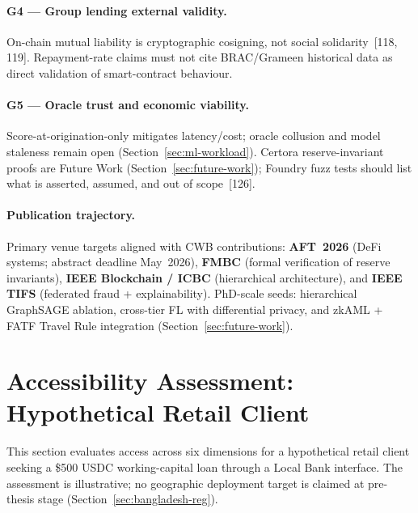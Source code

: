 \documentclass[12pt,a4paper]{report}
\begin{document}
\paragraph{G4 --- Group lending external validity.}
On-chain mutual liability is cryptographic cosigning, not social solidarity~[118, 119]. Repayment-rate claims must not cite BRAC/Grameen historical data as direct validation of smart-contract behaviour.

\paragraph{G5 --- Oracle trust and economic viability.}
Score-at-origination-only mitigates latency/cost; oracle collusion and model staleness remain open (Section~\ref{sec:ml-workload}). Certora reserve-invariant proofs are Future Work (Section~\ref{sec:future-work}); Foundry fuzz tests should list what is asserted, assumed, and out of scope~[126].

\paragraph{Publication trajectory.}
Primary venue targets aligned with CWB contributions: \textbf{AFT~2026} (DeFi systems; abstract deadline May~2026), \textbf{FMBC} (formal verification of reserve invariants), \textbf{IEEE Blockchain / ICBC} (hierarchical architecture), and \textbf{IEEE TIFS} (federated fraud + explainability). PhD-scale seeds: hierarchical GraphSAGE ablation, cross-tier FL with differential privacy, and zkAML + FATF Travel Rule integration (Section~\ref{sec:future-work}).

\section{Accessibility Assessment: Hypothetical Retail Client}

This section evaluates access across six dimensions for a hypothetical retail client seeking a \$500 USDC working-capital loan through a Local Bank interface. The assessment is illustrative; no geographic deployment target is claimed at pre-thesis stage (Section~\ref{sec:bangladesh-reg}).
\end{document}
